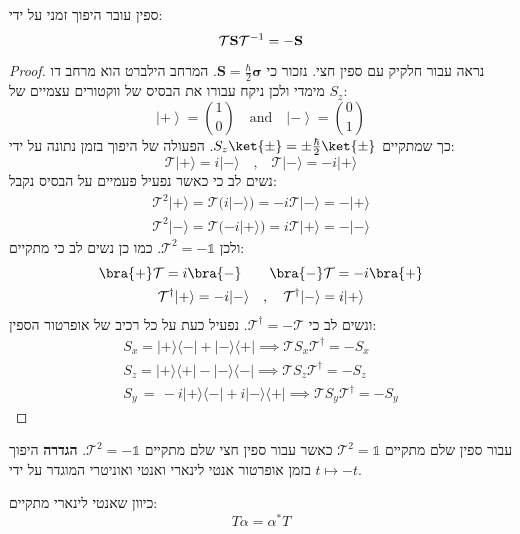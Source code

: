 \documentclass{tstextbook}
\begin{document}
\begin{proposition}
ספין עובר היפוך זמני על ידי:
$$\mathcal{T}{\bf S}\mathcal{T}^{-1}=-{\bf S}$$

\end{proposition}
\begin{proof}
נראה עבור חלקיק עם ספין חצי. נזכור כי \(\mathbf{S}=\frac{\hbar}{2}\boldsymbol\sigma\). המרחב הילברט הוא מרחב דו מימדי ולכן ניקח עבורו את הבסיס של ווקטורים עצמיים של \(S_{z}\):
$$\left|+\right>={\binom{1}{0}}\quad{\mathrm{and}}\quad\left|-\right>={\binom{0}{1}}$$
כך שמתקיים \(S_{z}\ket{\pm}=\pm \frac{\hbar}{2}\ket{\pm}\). הפעולה של היפוך בזמן נתונה על ידי:
$$\mathcal{T}|+\rangle=i|-\rangle\,\,\,\,\,\,,\,\,\,\,\,\mathcal{T}|-\rangle=-i|+\rangle$$
נשים לב כי כאשר נפעיל פעמיים על הבסיס נקבל:
$$\begin{gather}\mathcal{T}^{2}|+\rangle=\mathcal{T}(i|-\rangle)=-i\mathcal{T}|-\rangle=-|+\rangle \\\mathcal{T}^{2}|-\rangle=\mathcal{T}(-i|+\rangle)=i\mathcal{T}|+\rangle=-|-\rangle
\end{gather}$$
ולכן \(\mathcal{T}^{2}=-\mathbb{1}\). כמו כן נשים לב כי מתקיים:
$$\begin{gather}\bra{+} \mathcal{T} =i\bra{-} \qquad\bra{-} \mathcal{T} =-i\bra{+}  \\\mathcal{T}^{\dagger}|+\rangle=-i|-\rangle\quad,\quad\mathcal{T}^{\dagger}|-\rangle=i|+\rangle
\end{gather}$$
ונשים לב כי \(\mathcal{T}^{\dagger}=-\mathcal{T}\). נפעיל כעת על כל רכיב של אופרטור הספין:
$$\begin{gather}S_{x}=|+\rangle\langle-|+|-\rangle\langle+|\implies\mathcal{T} S_{x}\mathcal{T}^{\dagger}=-S_{x} \\S_{z}=|+\rangle\langle+|-|-\rangle\langle-|\implies\mathcal{T} S_{z}\mathcal{T}^{\dagger}=-S_{z} \\S_{y}\,=\,-i|+\rangle\langle-|+i|-\rangle\langle+|\implies\mathcal{T} S_{y}\mathcal{T}^{\dagger}=-S_{y}
\end{gather}$$

\end{proof}
\begin{proposition}
עבור ספין שלם מתקיים \(\mathcal{T}^{2}=\mathbb{1}\) כאשר עבור ספין חצי שלם מתקיים \(\mathcal{T}^{2}=-\mathbb{1}\).
\textbf{הגדרה} היפוך בזמן
אופרטור אנטי לינארי ואנטי ואוניטרי המוגדר על ידי \(t\mapsto -t\).

\end{proposition}
\begin{corollary}
כיוון שאנטי לינארי מתקיים:
$$T\alpha=\alpha^{*}T$$

\end{corollary}
\end{document}
